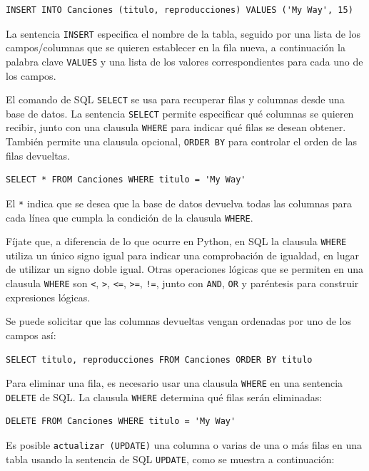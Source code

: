 \beforeverb
\begin{verbatim}
INSERT INTO Canciones (titulo, reproducciones) VALUES ('My Way', 15)
\end{verbatim}
\afterverb
%
La sentencia {\tt INSERT} especifica el nombre de la tabla, seguido por una lista
de los campos/columnas que se quieren establecer en la fila nueva, a continuación
la palabra clave {\tt VALUES} y una lista de los valores correspondientes
para cada uno de los campos.

El comando de SQL {\tt SELECT} se usa para recuperar filas y columnas desde una base de datos.
La sentencia {\tt SELECT} permite especificar qué columnas se quieren
recibir, junto con una clausula {\tt WHERE} para indicar qué 
filas se desean obtener. También permite una clausula opcional,
{\tt ORDER BY} para controlar el orden de las filas devueltas.

\beforeverb
\begin{verbatim}
SELECT * FROM Canciones WHERE titulo = 'My Way'
\end{verbatim}
\afterverb
%
El \verb"*" indica que se desea que la base de datos devuelva todas las
columnas para cada línea que cumpla la condición de la clausula {\tt WHERE}.

Fíjate que, a diferencia de lo que ocurre en Python, en SQL la clausula {\tt WHERE}
utiliza un único signo igual
para indicar una comprobación de igualdad, en lugar de utilizar un signo doble igual.
Otras operaciones lógicas que se permiten en una clausula {\tt WHERE} son
\verb"<",
\verb">",
\verb"<=",
\verb">=",
\verb"!=",
junto con {\tt AND}, {\tt OR} y paréntesis
para construir expresiones lógicas.

Se puede solicitar que las columnas devueltas vengan ordenadas por uno
de los campos así:

\beforeverb
\begin{verbatim}
SELECT titulo, reproducciones FROM Canciones ORDER BY titulo
\end{verbatim}
\afterverb
%
Para eliminar una fila, es necesario usar una clausula {\tt WHERE} en una sentencia
{\tt DELETE} de SQL. La clausula {\tt WHERE} determina qué filas serán eliminadas:

\beforeverb
\begin{verbatim}
DELETE FROM Canciones WHERE titulo = 'My Way'
\end{verbatim}
\afterverb
%
Es posible {\tt actualizar (UPDATE)} una columna o varias de una o más filas
en una tabla usando la sentencia de SQL {\tt UPDATE}, como se muestra a continuación:

